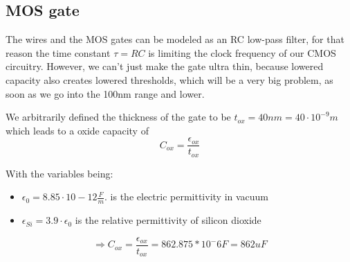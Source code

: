 \subsection{MOS gate}
The wires and the MOS gates can be modeled as an RC low-pass filter, for that reason the time constant $\tau=RC$ is limiting the clock frequency of our CMOS circuitry.
However, we can't just make the gate ultra thin, because lowered capacity also creates lowered thresholds, which will be a very big problem, as soon as we go into the 100nm range and lower.

We arbitrarily defined the thickness of the gate to be $t_{ox}=40 nm=40 \cdot 10^{-9}m$ which leads to a oxide capacity of 
\begin{equation}
C_{ox}=\frac{\epsilon_{ox}}{t_{ox}}
\end{equation}

With the variables being:
\begin{itemize}
\item $\epsilon_0 = 8.85 \cdot 10−12 \frac{F}{m}. $ is the electric permittivity in vacuum
\item $\epsilon_{Si} =3.9 \cdot \epsilon_0$ is the relative permittivity of silicon dioxide
\end{itemize}

\begin{equation}
\Rightarrow
C_{ox}=\frac{\epsilon_{ox}}{t_{ox}} = 862.875*10^-6 F = 862 uF
\end{equation}
